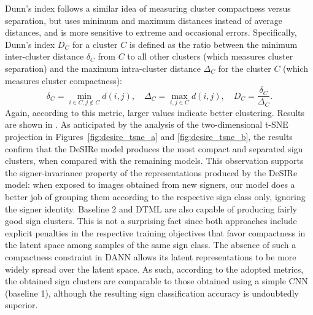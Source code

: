 Dunn's index follows a similar idea of measuring cluster compactness versus separation, but uses minimum and maximum distances instead of average distances, and is more sensitive to extreme and occasional errors. Specifically, Dunn's index $D_C$ for a cluster $C$ is defined as the ratio between the minimum inter-cluster distance $\delta_C$ from $C$ to all other clusters (which measures cluster separation) and the maximum intra-cluster distance $\Delta_C$ for the cluster $C$ (which measures cluster compactness):
\begin{equation}
    \delta_C = \min_{i \in C, j \not\in C} d(i,j), \quad \Delta_C = \max_{i,j \in C} d(i,j), \quad  D_C = \frac{\delta_C}{\Delta_C}.
\end{equation}
Again, according to this metric, larger values indicate better clustering.
Results are shown in . As anticipated by the analysis of the two-dimensional t-SNE projection in Figures~\ref{fig:desire_tsne_a} and \ref{fig:desire_tsne_b}, the results confirm that the DeSIRe model produces the most compact and separated sign clusters, when compared with the remaining models. This observation supports the signer-invariance property of the representations produced by the DeSIRe model: when exposed to images obtained from new signers, our model does a better job of grouping them according to the respective sign class only, ignoring the signer identity. Baseline 2 and DTML are also capable of producing fairly good sign clusters. This is not a surprising fact since both approaches include explicit penalties in the respective training objectives that favor compactness in the latent space among samples of the same sign class. The absence of such a compactness constraint in DANN allows its latent representations to be more widely spread over the latent space. As such, according to the adopted metrics, the obtained sign clusters are comparable to those obtained using a simple CNN (baseline 1), although the resulting sign classification accuracy is undoubtedly superior.

